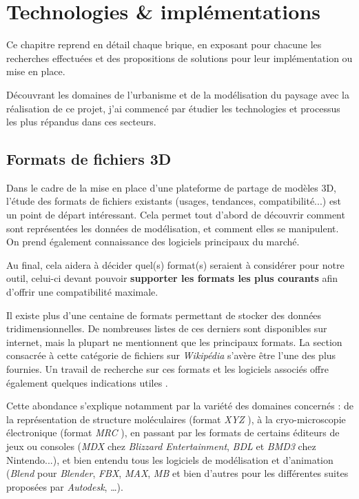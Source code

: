 \chapter{Technologies \& implémentations}
\label{Chapter3}

Ce chapitre reprend en détail chaque brique, en exposant pour chacune les recherches effectuées et des propositions de solutions pour leur implémentation ou mise en place.

Découvrant les domaines de l'urbanisme et de la modélisation du paysage avec la réalisation de ce projet, j'ai commencé par étudier les technologies et processus les plus répandus dans ces secteurs.

\section{Formats de fichiers 3D}

Dans le cadre de la mise en place d'une plateforme de partage de modèles 3D, l'étude des formats de fichiers existants (usages, tendances, compatibilité...) est un point de départ intéressant. Cela permet tout d'abord de découvrir comment sont représentées les données de modélisation, et comment elles se manipulent. On prend également connaissance des logiciels principaux du marché.

Au final, cela aidera à décider quel(s) format(s) seraient à considérer pour notre outil, celui-ci devant pouvoir \textbf{supporter les formats les plus courants} afin d'offrir une compatibilité maximale.

Il existe plus d'une centaine de formats permettant de stocker des données tridimensionnelles. De nombreuses listes de ces derniers sont disponibles sur internet, mais la plupart ne mentionnent que les principaux formats. La section consacrée à cette catégorie de fichiers sur \textit{Wikipédia}  \cite{wikipedia-3d-file-formats-list} s'avère être l'une des plus fournies. Un travail  de recherche sur ces formats et les logiciels associés offre également quelques indications utiles \cite{overview-of-3d-data-content}.

Cette abondance s'explique notamment par la variété des domaines concernés : de la représentation de structure moléculaires (format \textit{XYZ} \cite{xyz-format}), à la cryo-microscopie électronique (format \textit{MRC} \cite{mrc-format}), en passant par les formats de certains éditeurs de jeux ou consoles (\textit{MDX} chez \textit{Blizzard Entertainment}, \textit{BDL} et \textit{BMD3} chez Nintendo...), et bien entendu tous les logiciels de modélisation et d'animation (\textit{Blend} pour \textit{Blender}, \textit{FBX}, \textit{MAX}, \textit{MB} et bien d'autres pour les différentes suites proposées par \textit{Autodesk}, \ldots).

